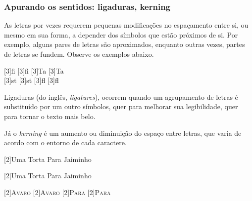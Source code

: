 \subsubsection{Apurando os sentidos: ligaduras, kerning}%

As letras por vezes requerem pequenas modificações no espaçamento
entre si, ou mesmo em sua forma, a depender dos símbolos que estão
próximos de si. Por exemplo, alguns pares de letras são aproximados,
enquanto outras vezes, partes de letras se fundem. Observe os exemplos
abaixo.

\medskip
\noindent\begin{center}%
\scalebox{3}[3]{f{i}}\hfil%
\scalebox{3}[3]{fi}\hfil%
\scalebox{3}[3]{T{a}}\hfil%
\scalebox{3}[3]{Ta}
\\[.9cm] 
\scalebox{3}[3]{s{t}}\hfil%
\scalebox{3}[3]{st}\hfil%
\scalebox{3}[3]{f{l}}\hfil%
\scalebox{3}[3]{fl}
\end{center}
\medskip

Ligaduras (do inglês, \emph{ligatures}), ocorrem quando um agrupamento
de letras é substituído por um outro símbolos, quer para melhorar sua
legibilidade, quer para tornar o texto mais belo.

Já o \emph{kerning} é um aumento ou diminuição do espaço entre letras,
que varia de acordo com o entorno de cada caractere.

\medskip
\noindent\begin{center}%
\scalebox{2}[2]{Uma {T}orta {P}ara {J}aiminho}

\scalebox{2}[2]{Uma Torta Para Jaiminho}

\medskip

\scalebox{2}[2]{\textsc{{A}v{a}r{o}}}\hfil%
\scalebox{2}[2]{\textsc{Avaro}}%
\hfil\scalebox{2}[2]{\textsc{{P}a{r}a}}
\hfil\scalebox{2}[2]{\textsc{Para}}\hfil
\end{center}

\begin{comment}
  (breve) história do TeX, do LaTeX e irmãos
  Resumo de como o sistema ``monta'' as páginas
\end{comment}



